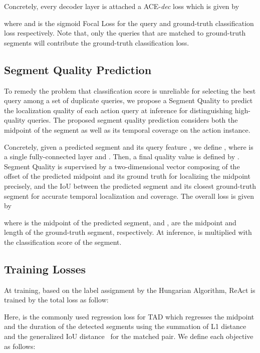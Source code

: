 \documentclass[runningheads]{llncs}
\def\name{ReAct }
\def\score{Segment Quality }
\begin{document}
Concretely, every decoder layer is attached a ACE-\emph{dec} loss which is given by  

where  and  is the sigmoid Focal Loss\cite{lin2017focal} for the query and ground-truth classification loss respectively. Note that, only the queries that are matched to ground-truth segments will contribute the ground-truth classification loss.




\subsection{Segment Quality Prediction}
To remedy the problem that classification score is unreliable for selecting the best query among a set of duplicate queries, we propose a \score to predict the localization quality of each action query at inference for distinguishing high-quality queries. 
The proposed segment quality prediction considers both the midpoint of the segment as well as its temporal coverage on the action instance.


Concretely, given a predicted segment  and its query feature , we define , where  is a single fully-connected layer and . Then, a final quality value  is defined by . \score is supervised by a two-dimensional vector composing of the offset of the predicted midpoint and its ground truth for localizing the midpoint precisely, and the IoU between the predicted segment and its closest ground-truth segment for accurate temporal localization and coverage. The overall loss is given by       





where  is the midpoint of the predicted segment, and ,  are the midpoint and length of the ground-truth segment, respectively. At inference,  is multiplied with the classification score of the segment.





\subsection{Training Losses}
At training, based on the label assignment by the Hungarian Algorithm, \name is trained by the total loss as follow: 

 
Here,  is the commonly used regression loss for TAD which regresses the midpoint and the duration of the detected segments using the summation of L1 distance and the generalized IoU distance~\cite{rezatofighi2019generalized} for the matched pair. We define each objective as follows:
 
\end{document}
